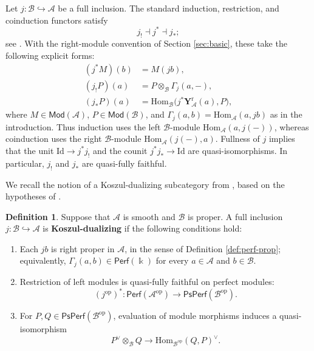 \documentclass[11pt,letterpaper,reqno]{amsart}
\theoremstyle{plain}
\theoremstyle{definition}
\newtheorem{definition}[definition]{Definition}
\theoremstyle{plain}
\theoremstyle{definition}
\numberwithin{equation}{section}
\begin{document}
Let $j:\mathscr B\hookrightarrow\mathscr A$ be a full inclusion.
The standard induction, restriction, and coinduction functors satisfy
\begin{equation}\label{eq:j-adjunction}
j_!\dashv j^*\dashv j_*;
\end{equation}
see \cite[Section 3.8]{Keller2006b}.
With the right-module convention of Section \ref{sec:basic}, these take the following explicit forms:
\begin{equation}\label{eq:j-module-formulas}
\begin{aligned}
(j^*M)(b)&=M(jb),\\
(j_!P)(a)&=P\otimes_{\mathscr B} \Gamma_j(a,-),\\
(j_*P)(a)&=\mathrm{Hom}_{\mathscr B}\bigl(j^*\mathbf Y_{\mathscr A}^{\mathrm r}(a),P\bigr),
\end{aligned}
\end{equation}
where $M\in\mathsf{Mod}(\mathscr A)$, $P\in\mathsf{Mod}(\mathscr B)$, and $\Gamma_j(a,b)=\mathrm{Hom}_{\mathscr A}(a,jb)$ as in the introduction.
Thus induction uses the left $\mathscr B$-module $\mathrm{Hom}_{\mathscr A}(a,j(-))$, whereas coinduction uses the right $\mathscr B$-module $\mathrm{Hom}_{\mathscr A}(j(-),a)$.
Fullness of $j$ implies that the unit $\mathrm{Id}\to j^*j_!$ and the counit $j^*j_*\to\mathrm{Id}$ are quasi-isomorphisms.
In particular, $j_!$ and $j_*$ are quasi-fully faithful.

We recall the notion of a Koszul-dualizing subcategory from \cite[Definition 2.12]{Ganatra-Gao-Venkatesh2022}, based on the hypotheses of \cite[Proposition 9.3]{Efimov2017}.

\begin{definition}\label{def:Koszul-duality}
Suppose that $\mathscr A$ is smooth and $\mathscr B$ is proper.
A full inclusion $j:\mathscr B\hookrightarrow\mathscr A$ is \textbf{Koszul-dualizing} if the following conditions hold:
\begin{enumerate}
    \item[(i)] Each $jb$ is right proper in $\mathscr A$, in the sense of Definition \ref{def:perf-prop}; equivalently, $\Gamma_j(a,b)\in\mathsf{Perf}(\Bbbk)$ for every $a\in\mathscr A$ and $b\in\mathscr B$.
    \item[(ii)] Restriction of left modules is quasi-fully faithful on perfect modules:
    \begin{equation}\label{eq:left-Koszul}
    (j^{\mathrm{op}})^*:\mathsf{Perf}(\mathscr A^{\mathrm{op}})\longrightarrow\mathsf{PsPerf}(\mathscr B^{\mathrm{op}}).
    \end{equation}
    \item[(iii)] For $P,Q\in\mathsf{PsPerf}(\mathscr B^{\mathrm{op}})$, evaluation of module morphisms induces a quasi-isomorphism
    \begin{equation}\label{eq:GGV-tensor}
    P^\vee\otimes_{\mathscr B} Q
    \longrightarrow\mathrm{Hom}_{\mathscr B^{\mathrm{op}}}(Q,P)^\vee.
    \end{equation}
\end{enumerate}
\end{definition}
\end{document}
